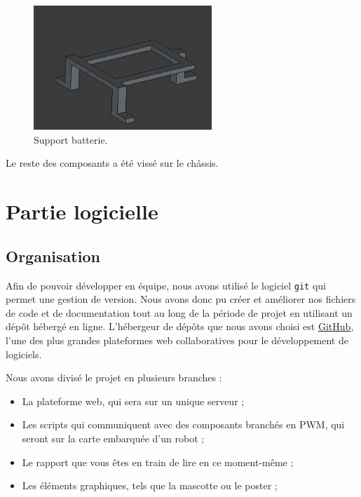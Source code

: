 \documentclass[a4paper,12pt]{report}  %
\begin{document}
\begin{figure}[H]
	\centering
	\includegraphics[width=0.6\textwidth]{./attachments/support_batterie_impression.png}
	\caption{Support batterie.}
\end{figure}

Le reste des composants a été vissé sur le châssis.

\section{Partie logicielle}
\subsection{Organisation}

Afin de pouvoir développer en équipe, nous avons utilisé le logiciel \texttt{git} qui permet une gestion de version. Nous avons donc pu créer et améliorer nos fichiers de code et de documentation tout au long de la période de projet en utilisant un dépôt hébergé en ligne. L'hébergeur de dépôts que nous avons choisi est \href{https://github.com/}{GitHub}, l'une des plus grandes plateformes web collaboratives pour le développement de logiciels. 

Nous avons divisé le projet en plusieurs branches : 

\begin{itemize}
	\item La plateforme web, qui sera sur un unique serveur ; 
	
	\item Les scripts qui communiquent avec des composants branchés en PWM, qui seront sur la carte embarquée d'un robot ; 
	
	\item Le rapport que vous êtes en train de lire en ce moment-même ; 
	
	\item Les éléments graphiques, tels que la mascotte ou le poster ; 
	
\end{itemize}
\end{document}
